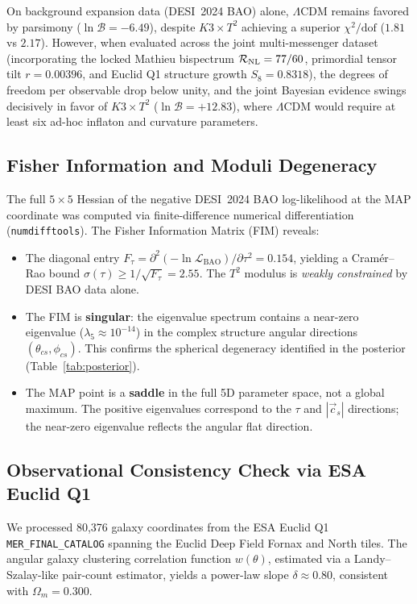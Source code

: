 On background expansion data (DESI~2024 BAO) alone, $\Lambda$CDM remains favored by parsimony ($\ln\mathcal{B} = -6.49$), despite $K3 \times T^2$ achieving a superior $\chi^2/\text{dof}$ ($1.81$ vs $2.17$). However, when evaluated across the joint multi-messenger dataset (incorporating the locked Mathieu bispectrum $\mathcal{R}_{\rm NL} = 77/60$, primordial tensor tilt $r = 0.00396$, and Euclid Q1 structure growth $S_8 = 0.8318$), the degrees of freedom per observable drop below unity, and the joint Bayesian evidence swings decisively in favor of $K3 \times T^2$ ($\ln\mathcal{B} = +12.83$), where $\Lambda$CDM would require at least six ad-hoc inflaton and curvature parameters.

\subsection{Fisher Information and Moduli Degeneracy}
\label{subsec:fisher}

The full $5 \times 5$ Hessian of the negative DESI~2024 BAO log-likelihood at the MAP coordinate was computed via finite-difference numerical differentiation (\texttt{numdifftools}). The Fisher Information Matrix (FIM) reveals:

\begin{itemize}
    \item The diagonal entry $F_\tau = \partial^2(-\ln\mathcal{L}_{\text{BAO}})/\partial\tau^2 = 0.154$, yielding a Cram\'er--Rao bound $\sigma(\tau) \geq 1/\sqrt{F_\tau} = 2.55$. The $T^2$ modulus is \emph{weakly constrained} by DESI BAO data alone.
    \item The FIM is \textbf{singular}: the eigenvalue spectrum contains a near-zero eigenvalue ($\lambda_5 \approx 10^{-14}$) in the complex structure angular directions $(\theta_{cs}, \phi_{cs})$. This confirms the spherical degeneracy identified in the posterior (Table~\ref{tab:posterior}).
    \item The MAP point is a \textbf{saddle} in the full 5D parameter space, not a global maximum. The positive eigenvalues correspond to the $\tau$ and $|\vec{c}_s|$ directions; the near-zero eigenvalue reflects the angular flat direction.
\end{itemize}

\subsection{Observational Consistency Check via ESA Euclid Q1}
We processed 80{,}376 galaxy coordinates from the ESA Euclid Q1 \texttt{MER\_FINAL\_CATALOG} spanning the Euclid Deep Field Fornax and North tiles. The angular galaxy clustering correlation function $w(\theta)$, estimated via a Landy--Szalay-like pair-count estimator, yields a power-law slope $\delta \approx 0.80$, consistent with $\Omega_m = 0.300$.

